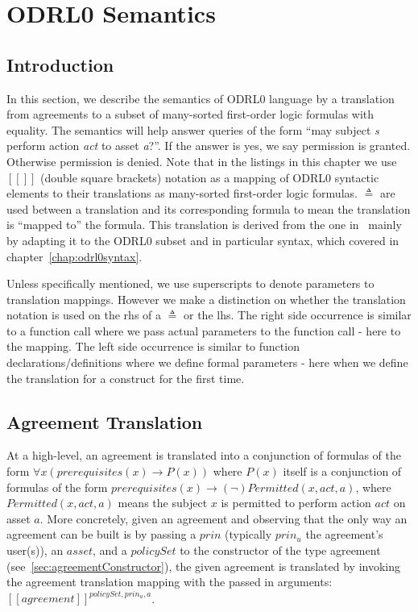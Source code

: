 \chapter{ODRL0 Semantics}\label{chap:semantics}

                  
\section{Introduction}\label{sec:introsemantics}


In this section, we describe the semantics of ODRL0 language by a translation from agreements to a subset of many-sorted first-order logic formulas with equality. The semantics will help answer queries of the form ``may subject \emph{s} perform action \emph{act} to asset \emph{a}?''. If the answer is yes, we say permission is granted. Otherwise permission is denied. Note that in the listings in this chapter we use $[\![]\!]$ (double square brackets) notation as a mapping of ODRL0 syntactic elements to their translations as many-sorted first-order logic formulas. $\triangleq$ are used between a translation and its corresponding formula to mean the translation is ``mapped to'' the formula. This translation is derived from the one in~\cite{pucella2006} mainly by adapting it to the ODRL0 subset and in particular syntax, which covered in chapter~\ref{chap:odrl0syntax}.

Unless specifically mentioned, we use superscripts to denote parameters to translation mappings. However we make a distinction on whether the translation notation is used on the \ac{rhs} of a $\triangleq$ or the \ac{lhs}. The right side occurrence is similar to a function call where we pass actual parameters to the function call - here to the mapping. The left side occurrence is similar to function declarations/definitions where we define formal parameters - here when we define the translation for a construct for the first time. 

\section{Agreement Translation}

At a high-level, an agreement is translated into a conjunction of formulas of the form $\forall x ( prerequisites(x) \rightarrow P(x))$ where $P(x)$ itself is a conjunction of formulas of the form $ prerequisites(x) \rightarrow (\lnot) Permitted (x, act, a)$, where $Permitted (x, act, a)$ means the subject $x$ is permitted to perform action $act$ on asset $a$. More concretely, given an agreement and observing that the only way an agreement can be built is by passing a $prin$ (typically $prin_{u}$ the agreement's user(s)), an $asset$, and a $policySet$ to the constructor of the type agreement (see~\ref{sec:agreementConstructor}), the given agreement is translated by invoking the agreement translation mapping with the passed in arguments: $[\![agreement]\!]^{policySet, prin_{u}, a}$. 


